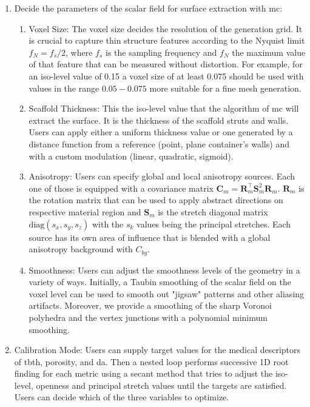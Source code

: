 \documentclass[11pt]{article}
\begin{document}
\begin{enumerate}
\item Decide the parameters of the scalar field for surface extraction with \gls{mc}:
\begin{enumerate}
\item Voxel Size: The voxel size decides the resolution of the generation grid. It is crucial to capture thin structure features according to the Nyquist limit $f_N = f_s / 2$, where $f_s$ is the sampling frequency and $f_N$ the maximum value of that feature that can be measured without distortion. For example, for an iso-level value of 0.15 a voxel size of at least 0.075 should be used with values in the range $0.05 - 0.075$ more suitable for a fine mesh generation.
\item Scaffold Thickness: This the iso-level value that the algorithm of \gls{mc} will extract the surface. It is the thickness of the scaffold struts and walls. Users can apply either a uniform thickness value or one generated by a distance function from a reference (point, plane container's walls) and with a custom modulation (linear, quadratic, sigmoid).
\item Anisotropy: Users can specify global and local anisotropy sources. Each one of those is equipped with a covariance matrix $\mathbf{C}_{m}=\mathbf{R}_{m}^{\!\top}\mathbf{S}_{m}^{2}\mathbf{R}_{m}$. $\mathbf{R}_{m}$ is the rotation matrix that can be used to apply abstract directions on respective material region and $\mathbf{S}_{m}$ is the stretch diagonal matrix $\mathrm{diag}(s_x,s_y,s_z)$ with the $s_k$ values being the principal stretches. Each source has its own area of influence that is blended with a global anisotropy background with $C_{bg}$.
\item Smoothness: Users can adjust the smoothness levels of the geometry in a variety of ways. Initially, a Taubin smoothing of the scalar field on the voxel level can be used to smooth out "jigsaw" patterns and other aliasing artifacts. Moreover, we provide a smoothing of the sharp Voronoi polyhedra and the vertex junctions with a polynomial minimum smoothing.   
\end{enumerate}

\item Calibration Mode: Users can supply target values for the medical descriptors of \gls{tbth}, porosity, and \gls{da}. Then a nested loop performs successive 1D root finding for each metric using a secant method that tries to adjust the iso-level, openness and principal stretch values until the targets are satisfied. Users can decide which of the three variables to optimize.


\end{enumerate}
\end{document}
